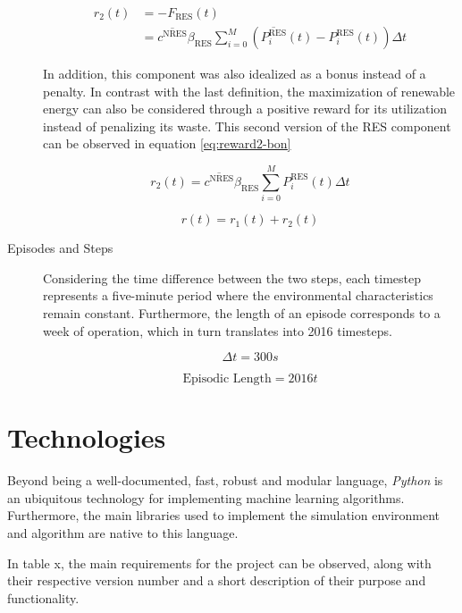 \begin{description}
	\begin{equation} \label{eq:reward2-pen}
		\begin{split}
			r_2(t) &= - F_\text{RES}(t) \\
			&= \overline{c^\text{NRES}} \beta_\text{RES} \sum^M_{i=0} (\overline{P^\text{RES}_i}(t) - P^\text{RES}_i(t)) \Delta t 
		\end{split}
	\end{equation}
	
	In addition, this component was also idealized as a bonus instead of a penalty. In contrast with the last definition, the maximization of renewable energy can also be considered through a positive reward for its utilization instead of penalizing its waste. This second version of the \ac{RES} component can be observed in equation \ref{eq:reward2-bon}\par
	
	\begin{equation} \label{eq:reward2-bon}
		r_2(t) = \overline{c^\text{NRES}} \beta_\text{RES} \sum^M_{i=0} P^\text{RES}_i(t) \Delta t 
	\end{equation}
	
	\begin{equation}
		r(t) = r_1(t) + r_2(t)
	\end{equation}
	
	\item[Episodes and Steps] Considering the time difference between the two steps, each timestep represents a five-minute period where the environmental characteristics remain constant. Furthermore, the length of an episode corresponds to a week of operation, which in turn translates into 2016 timesteps. \par

	
	\begin{equation}
		\Delta t = 300 s
	\end{equation}
	
	\begin{equation}
		\text{Episodic Length} = 2016 t
	\end{equation}
	
\end{description}

\section{Technologies}

Beyond being a well-documented, fast, robust and modular language, \textit{Python} is an ubiquitous technology for implementing machine learning algorithms. Furthermore, the main libraries used to implement the simulation environment and algorithm are native to this language.
\par
In table x, the main requirements for the project can be observed, along with their respective version number and a short description of their purpose and functionality.
\par

